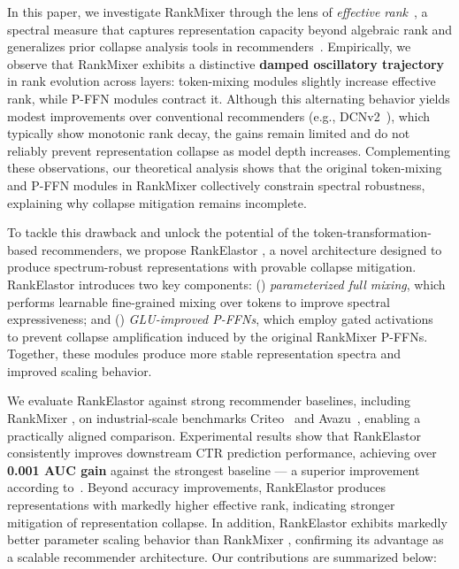 \documentclass[sigconf,screen]{acmart}
\newcommand{\unimixer}{RankElastor }
\newcommand{\rankmixer}{RankMixer }
\begin{document}
In this paper, we investigate \rankmixer through the lens of \textit{effective rank}~\cite{effective-rank,norm-erank-1}, a spectral measure that captures representation capacity beyond algebraic rank and generalizes prior collapse analysis tools in recommenders~\cite{embedding-collapse-1-multiembedding,feagen}. 
Empirically, we observe that \rankmixer exhibits a distinctive \textbf{damped oscillatory trajectory} in rank evolution across layers: token-mixing modules slightly increase effective rank, while P-FFN modules contract it. 
Although this alternating behavior yields modest improvements over conventional recommenders (e.g., DCNv2~\cite{dcnv2+crossnet}), which typically show monotonic rank decay, the gains remain limited and do not reliably prevent representation collapse as model depth increases. 
Complementing these observations, our theoretical analysis shows that the original token-mixing and P-FFN modules in \rankmixer collectively constrain spectral robustness, explaining why collapse mitigation remains incomplete.

To tackle this drawback and unlock the potential of the token-transformation-based recommenders, we propose \unimixer, a novel architecture designed to produce spectrum-robust representations with provable collapse mitigation. 
\unimixer introduces two key components: (\textbf{}) \textit{parameterized full mixing}, which performs learnable fine-grained mixing over tokens to improve spectral expressiveness; and (\textbf{}) \textit{GLU-improved P-FFNs}, which employ gated activations~\cite{GLU-activation} to prevent collapse amplification induced by the original \rankmixer P-FFNs. 
Together, these modules produce more stable representation spectra and improved scaling behavior.

We evaluate \unimixer against strong recommender baselines, including \rankmixer, on industrial-scale benchmarks Criteo~\cite{criteo} and Avazu~\cite{avazu}, enabling a practically aligned comparison. 
Experimental results show that \unimixer consistently improves downstream CTR prediction performance, achieving over \textbf{0.001 AUC gain} against the strongest baseline — a superior improvement according to~\cite{DIN}. 
Beyond accuracy improvements, \unimixer produces representations with markedly higher effective rank, indicating stronger mitigation of representation collapse. 
In addition, \unimixer exhibits markedly better parameter scaling behavior than \rankmixer, confirming its advantage as a scalable recommender architecture.
Our contributions are summarized below:
\end{document}
